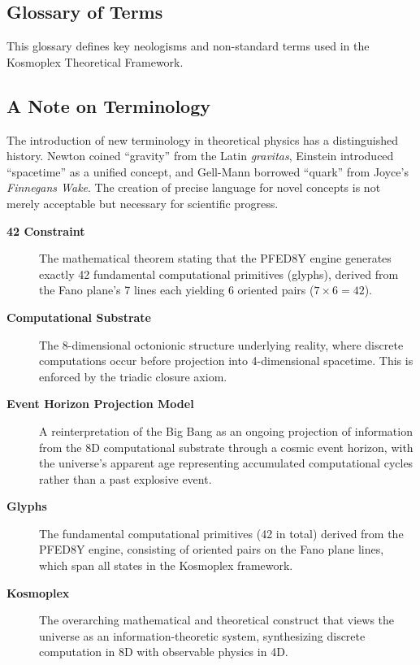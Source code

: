 \documentclass[pdflatex,sn-mathphys-num]{sn-jnl}
\theoremstyle{thmstyleone}
\theoremstyle{thmstyletwo}
\theoremstyle{thmstylethree}
\begin{document}
\begin{appendices}

\section{Glossary of Terms}\label{sec:glossary}
This glossary defines key neologisms and non-standard terms used in the Kosmoplex Theoretical Framework.

\subsection{A Note on Terminology}\label{subsec:terminology}
The introduction of new terminology in theoretical physics has a distinguished history. Newton coined ``gravity'' from the Latin \textit{gravitas}, Einstein introduced ``spacetime'' as a unified concept, and Gell-Mann borrowed ``quark'' from Joyce's \textit{Finnegans Wake}. The creation of precise language for novel concepts is not merely acceptable but necessary for scientific progress.

\begin{description}
\item[\textbf{42 Constraint}] The mathematical theorem stating that the PFED8Y engine generates exactly 42 fundamental computational primitives (glyphs), derived from the Fano plane's 7 lines each yielding 6 oriented pairs ($7 \times 6 = 42$).

\item[\textbf{Computational Substrate}] The 8-dimensional octonionic structure underlying reality, where discrete computations occur before projection into 4-dimensional spacetime.  This is enforced by the triadic closure axiom. 

\item[\textbf{Event Horizon Projection Model}] A reinterpretation of the Big Bang as an ongoing projection of information from the 8D computational substrate through a cosmic event horizon, with the universe's apparent age representing accumulated computational cycles rather than a past explosive event.

\item[\textbf{Glyphs}] The fundamental computational primitives (42 in total) derived from the PFED8Y engine, consisting of oriented pairs on the Fano plane lines, which span all states in the Kosmoplex framework.

\item[\textbf{Kosmoplex}] The overarching mathematical and theoretical construct that views the universe as an information-theoretic system, synthesizing discrete computation in 8D with observable physics in 4D.


\end{description}
\end{appendices}
\end{document}
